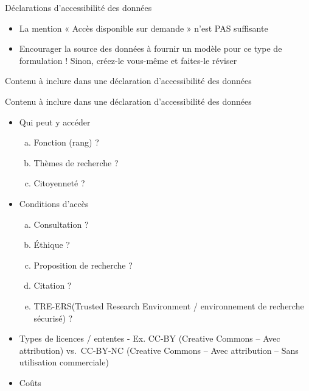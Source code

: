 \documentclass[
  ignorenonframetext,
]{beamer}
\providecommand{\tightlist}{%
  \setlength{\itemsep}{0pt}\setlength{\parskip}{0pt}}
\begin{document}
\begin{frame}{Déclarations d'accessibilité des données}
\label{duxe9clarations-daccessibilituxe9-des-donnuxe9es}
\begin{itemize}
\tightlist
\item
  La mention « Accès disponible sur demande » n'est PAS suffisante
\item
  Encourager la source des données à fournir un modèle pour ce type de
  formulation ! Sinon, créez-le vous-même et faites-le réviser
\end{itemize}
\end{frame}

\begin{frame}{Contenu à inclure dans une déclaration d'accessibilité des
données}
\label{contenu-uxe0-inclure-dans-une-duxe9claration-daccessibilituxe9-des-donnuxe9es}
\end{frame}

\begin{frame}{Contenu à inclure dans une déclaration d'accessibilité des
données}
\label{contenu-uxe0-inclure-dans-une-duxe9claration-daccessibilituxe9-des-donnuxe9es-1}
\begin{itemize}
\tightlist
\item
  Qui peut y accéder

  \begin{enumerate}
  [a.]
  \tightlist
  \item
    Fonction (rang) ?
  \item
    Thèmes de recherche ?
  \item
    Citoyenneté ?
  \end{enumerate}
\item
  Conditions d'accès

  \begin{enumerate}
  [a.]
  \tightlist
  \item
    Consultation ?
  \item
    Éthique ?
  \item
    Proposition de recherche ?
  \item
    Citation ?
  \item
    TRE-ERS(Trusted Research Environment / environnement de recherche
    sécurisé) ?
  \end{enumerate}
\item
  Types de licences / ententes - Ex. CC-BY (Creative Commons -- Avec
  attribution) vs.~CC-BY-NC (Creative Commons -- Avec attribution --
  Sans utilisation commerciale)
\item
  Coûts
\end{itemize}
\end{frame}
\end{document}
